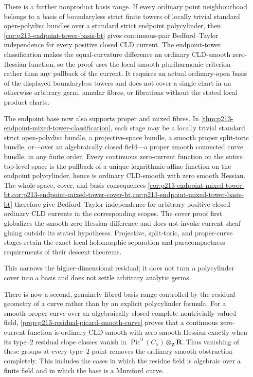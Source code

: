 There is a further nonproduct basis range.  If every ordinary point
neighbourhood belongs to a basis of boundaryless strict finite towers of
locally trivial standard open-polydisc bundles over a standard strict
endpoint polycylinder, then
\cref{cor:p213-endpoint-tower-basis-bt} gives continuous-pair
Bedford--Taylor independence for every positive closed CLD current.  The
endpoint-tower classification makes the equal-curvature difference an
ordinary CLD-smooth zero-Hessian function, so the proof uses the local smooth
pluriharmonic criterion rather than any pullback of the current.  It requires
an actual ordinary-open basis of the displayed boundaryless towers and does
not cover a single chart in an otherwise arbitrary germ, annular fibres, or
fibrations without the stated local product charts.

The endpoint base now also supports proper and mixed fibres.  In
\cref{thm:p213-endpoint-mixed-tower-classification}, each stage may be a
locally trivial standard strict open-polydisc bundle, a projective-space
bundle, a smooth proper split-toric bundle, or---over an algebraically
closed field---a proper smooth connected curve bundle, in any finite order.
Every continuous zero-current function
on the entire top-level space is the pullback of a unique logarithmic-affine
function on the endpoint polycylinder, hence is ordinary CLD-smooth with
zero smooth Hessian.  The whole-space, cover, and basis consequences
\cref{cor:p213-endpoint-mixed-tower-bt,cor:p213-endpoint-mixed-tower-cover-bt,cor:p213-endpoint-mixed-tower-basis-bt}
therefore give Bedford--Taylor independence for arbitrary positive closed
ordinary CLD currents in the corresponding scopes.  The cover proof first
globalizes the smooth zero-Hessian difference and does not invoke current
sheaf gluing outside its stated hypotheses.  Projective, split-toric, and
proper-curve stages retain the exact local holomorphic-separation and
paracompactness requirements of their descent theorems.

This narrows the higher-dimensional residual; it does not turn a
polycylinder cover into a basis and does not settle arbitrary analytic
germs.

There is now a second, genuinely fibred basis range controlled by the
residual geometry of a curve rather than by an explicit polycylinder
formula.  For a smooth proper curve over an algebraically closed complete
nontrivially valued field,
\cref{prop:p213-residual-picard-smooth-curve} proves that a continuous
zero-current function is ordinary CLD-smooth with zero smooth Hessian
exactly when its type--\(2\) residual slope classes vanish in
\(\operatorname{Pic}^0(C_x)\otimes_{\mathbf Z}\mathbf R\).  Thus vanishing
of these groups at every type--\(2\) point removes the ordinary-smooth
obstruction completely.  This includes the cases in which the residue field
is algebraic over a finite field and in which the base is a Mumford curve.

